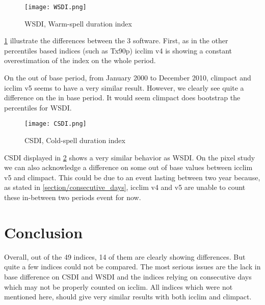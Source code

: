 \documentclass[a4paper,11pt]{article}
\begin{document}
    \begin{figure}[!hbt]
        \centering
        \texttt{[image: WSDI.png]}
        \caption{WSDI, Warm-spell duration index}
        \label{figure/wsdi}
    \end{figure}
    
    \ref{figure/wsdi} illustrate the differences between the 3 software.
    First, as in the other percentiles based indices (such as Tx90p) icclim v4 is showing a constant overestimation of the index on the whole period.

    On the out of base period, from January 2000 to December 2010, climpact and icclim v5 seems to have a very similar result.
    However, we clearly see quite a difference on the in base period. It would seem climpact does bootstrap the percentiles for WSDI.
   
    \begin{figure}[!hbt]
        \centering
        \texttt{[image: CSDI.png]}
        \caption{CSDI, Cold-spell duration index}
        \label{figure/csdi}
    \end{figure}

    CSDI displayed in \ref{figure/csdi} shows a very similar behavior as WSDI.
    On the pixel study we can also acknowledge a difference on some out of base values between icclim v5 and climpact. This could be due to an event lasting between two year because, as stated in \ref{section/consecutive_days}, icclim v4 and v5 are unable to count these in-between two periods event for now.
 
    
\part{Conclusion}
    Overall, out of the 49 indices, 14 of them are clearly showing differences.
    But quite a few indices could not be compared.
    The most serious issues are the lack in base difference on CSDI and WSDI and the indices relying on consecutive days which may not be properly counted on icclim.
    All indices which were not mentioned here, should give very similar results with both icclim and climpact.
\end{document}
